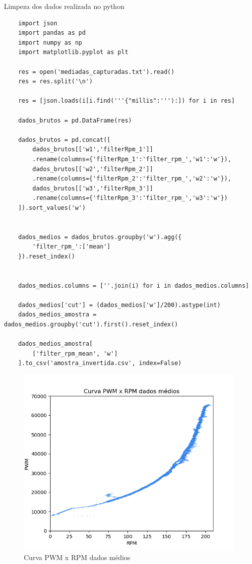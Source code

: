Limpeza dos dados realizada no python
\lstset{language=Python}
\begin{lstlisting}
    import json
    import pandas as pd
    import numpy as np
    import matplotlib.pyplot as plt
    
    res = open('mediadas_capturadas.txt').read()
    res = res.split('\n')
    
    res = [json.loads(i[i.find('''{"millis":'''):]) for i in res]
    
    dados_brutos = pd.DataFrame(res)
    
    dados_brutos = pd.concat([
        dados_brutos[['w1','filterRpm_1']]
        .rename(columns={'filterRpm_1':'filter_rpm_','w1':'w'}),
        dados_brutos[['w2','filterRpm_2']]
        .rename(columns={'filterRpm_2':'filter_rpm_','w2':'w'}),
        dados_brutos[['w3','filterRpm_3']]
        .rename(columns={'filterRpm_3':'filter_rpm_','w3':'w'})
    ]).sort_values('w')
    
    
    dados_medios = dados_brutos.groupby('w').agg({
        'filter_rpm_':['mean']
    }).reset_index()
    
    
    dados_medios.columns = [''.join(i) for i in dados_medios.columns]
    
    dados_medios['cut'] = (dados_medios['w']/200).astype(int)
    dados_medios_amostra = dados_medios.groupby('cut').first().reset_index()
    
    dados_medios_amostra[
        ['filter_rpm_mean', 'w']
    ].to_csv('amostra_invertida.csv', index=False)

\end{lstlisting}


\begin{figure}[h]
	\centering
	\includegraphics{figures/curva_pwm_x_rpm_dados_medios}
	\caption{Curva PWM x RPM dados médios}
	\label{fig:medicao_pwm_x_rpm_dados_medios}
\end{figure}



